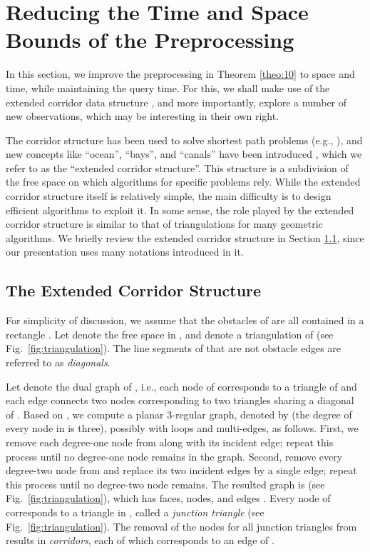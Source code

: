 \documentclass[english,runningheads,11pt]{llncs}
\begin{document}
\section{Reducing the Time and Space Bounds of the Preprocessing}
\label{sec:obstacle}

In this section, we improve the preprocessing
 in Theorem \ref{theo:10} to  space and  time,
while maintaining the  query time. For this, we shall make use
of the extended corridor data structure
\cite{ref:ChenA11ESA,ref:ChenCo12arXiv,ref:ChenL113STACS,ref:KapoorAn97}, and more importantly, explore
a number of new observations, which may be interesting in their own right.

The corridor structure has been used to solve shortest path problems (e.g., \cite{ref:InkuluPl09,ref:KapoorEf88,ref:KapoorAn97}), and new concepts like ``ocean'', ``bays'', and ``canals'' have been introduced \cite{ref:ChenA11ESA,ref:ChenCo12arXiv,ref:ChenCo12ICALP,ref:ChenCo13SoCG,ref:ChenL113STACS,ref:ChenVi13WADS}, which we refer to as the ``extended corridor structure''.
This structure is a subdivision of the free space on which algorithms for specific problems
rely.  While the extended corridor structure itself is relatively simple, the main difficulty is to design
efficient algorithms to exploit it. In some sense, the role played by the extended corridor structure is similar to that of triangulations for many geometric algorithms.
We briefly review the extended corridor structure in Section \ref{subsec:extended}, since our
presentation uses many notations introduced in it.

\subsection{The Extended Corridor Structure}
\label{subsec:extended}

For simplicity of discussion, we assume that the obstacles of  are all contained in a
rectangle .
Let  denote the free space in , and
 denote a triangulation of  (see Fig.~\ref{fig:triangulation}). The line segments of  that are not obstacle edges are referred to as {\em diagonals}.



Let  denote the dual graph of ,
i.e., each node of  corresponds to a
triangle of  and each edge connects two nodes
corresponding to two triangles sharing a diagonal of .
Based on , we
compute a planar 3-regular graph, denoted by  (the degree of every node in  is three),
possibly with loops and multi-edges,
as follows. First, we remove each degree-one node from 
along with its incident edge; repeat this process until no
degree-one node remains in the graph. Second, remove every degree-two node from
 and replace its two incident edges by a single edge;
repeat this process until no degree-two node remains. The
resulted graph is  (see Fig.~\ref{fig:triangulation}), which has
 faces, nodes, and  edges \cite{ref:KapoorAn97}. Every node of
 corresponds to a triangle in , called a
{\em junction triangle} (see Fig.~\ref{fig:triangulation}).
The removal of the nodes for all junction triangles from  results in 
{\em corridors}, each of which corresponds to an edge of .
\end{document}
